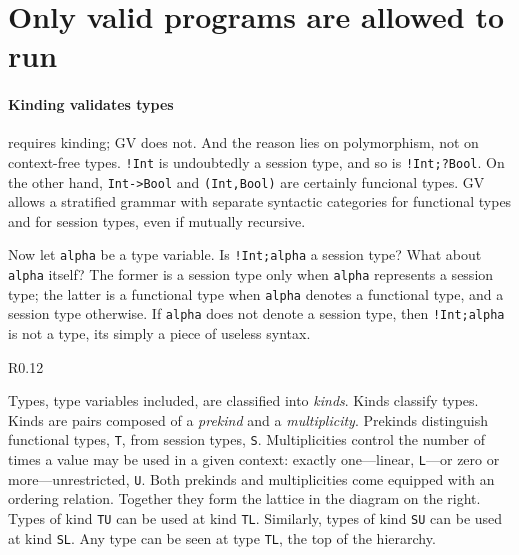 \section{Only valid programs are allowed to run}
\label{sec:valid}

\paragraph{Kinding validates types}

\freest{} requires kinding; GV does not. And the reason lies on
polymorphism, not on context-free types.
%
\lstinline|!Int| is undoubtedly a session type, and so is
\lstinline|!Int;?Bool|. On the other hand, \lstinline|Int->Bool| and
\lstinline|(Int,Bool)| are certainly funcional types. GV allows a
stratified grammar with separate syntactic categories for functional
types and for session types, even if mutually recursive.

Now let \lstinline|alpha| be a type variable. Is
\lstinline|!Int;alpha| a session type? What about \lstinline|alpha|
itself? The former is a session type only when \lstinline|alpha|
represents a session type; the latter is a functional type when
\lstinline|alpha| denotes a functional type, and a session type
otherwise. If \lstinline|alpha| does not denote a session type, then
\lstinline|!Int;alpha| is not a type, its simply a piece of useless
syntax.

\begin{wrapfigure}{R}{0.12\textwidth}
\end{wrapfigure}
%
Types, type variables included, are classified into \emph{kinds}. 
%
Kinds classify types. Kinds are pairs composed of a \emph{prekind} and
a \emph{multiplicity}. Prekinds distinguish functional types,
\lstinline|T|, from session types, \lstinline|S|.
%
Multiplicities control the number of times a value may be used in a
given context: exactly one---linear, \lstinline|L|---or zero or
more---unrestricted, \lstinline|U|. Both prekinds and multiplicities
come equipped with an ordering relation. Together they form the
lattice in the diagram on the right.
%
Types of kind \lstinline|TU| can be used at kind
\lstinline|TL|. Similarly, types of kind \lstinline|SU| can be used
at kind \lstinline|SL|. Any type can be seen at type \lstinline|TL|,
the top of the hierarchy.

